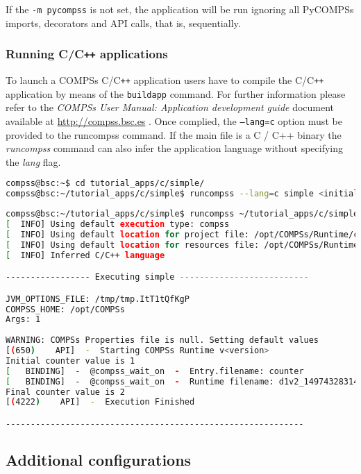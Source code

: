 If the \verb|-m pycompss| is not set, the application will be run ignoring all PyCOMPSs imports, decorators and API calls, that is, sequentially.


\subsubsection{Running C/C\texttt{++} applications}
To launch a COMPSs C/C\texttt{++} application users have to compile the C/C\texttt{++} application by means of the \texttt{buildapp} command.
For further information please refer to the \textit{COMPSs User Manual: Application development guide} document available at
\url{http://compss.bsc.es} . Once complied, the \texttt{--lang=c} option must be provided to the runcompss command. If the main file is 
a C / C++ binary the \textit{runcompss} command can also infer the application language without specifying the \textit{lang} flag. 

\begin{lstlisting}[language=bash]
compss@bsc:~$ cd tutorial_apps/c/simple/
compss@bsc:~/tutorial_apps/c/simple$ runcompss --lang=c simple <initial_number>
\end{lstlisting}

\begin{lstlisting}[language=bash]
compss@bsc:~/tutorial_apps/c/simple$ runcompss ~/tutorial_apps/c/simple/master/simple 1
[  INFO] Using default execution type: compss
[  INFO] Using default location for project file: /opt/COMPSs/Runtime/configuration/xml/projects/default_project.xml
[  INFO] Using default location for resources file: /opt/COMPSs/Runtime/configuration/xml/resources/default_resources.xml
[  INFO] Inferred C/C++ language

----------------- Executing simple --------------------------

JVM_OPTIONS_FILE: /tmp/tmp.ItT1tQfKgP
COMPSS_HOME: /opt/COMPSs
Args: 1
 
WARNING: COMPSs Properties file is null. Setting default values
[(650)    API]  -  Starting COMPSs Runtime v<version>
Initial counter value is 1
[   BINDING]  -  @compss_wait_on  -  Entry.filename: counter
[   BINDING]  -  @compss_wait_on  -  Runtime filename: d1v2_1497432831496.IT
Final counter value is 2
[(4222)    API]  -  Execution Finished

------------------------------------------------------------
\end{lstlisting}


\subsection{Additional configurations}

